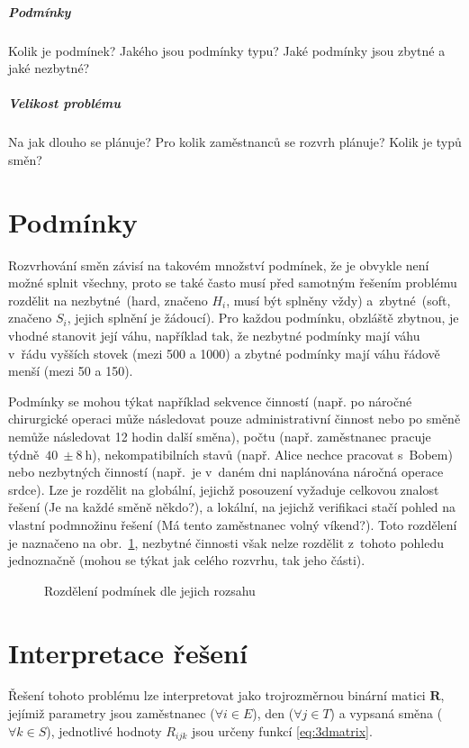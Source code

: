 \documentclass[twoside]{ctuthesis}
\begin{document}
\begin{enumerate}[label=\textbf{O\arabic*.}]
\subparagraph{Podmínky}
Kolik je podmínek? Jakého jsou podmínky typu? Jaké podmínky jsou zbytné a jaké nezbytné?

\subparagraph{Velikost problému}
Na jak dlouho se plánuje? Pro kolik zaměstnanců se rozvrh plánuje? Kolik je typů směn?


\section{Podmínky}
\label{sec:constraints}
Rozvrhování směn závisí na takovém množství podmínek, že je obvykle není možné splnit všechny, proto se také často musí před samotným řešením problému rozdělit na nezbytné~(hard, značeno $H_i$, musí být splněny vždy) a~zbytné~(soft, značeno $S_i$, jejich splnění je žádoucí). \cite{todorovic2012bee} Pro každou podmínku, obzláště zbytnou, je vhodné stanovit její váhu, například tak, že nezbytné podmínky mají váhu v~řádu vyšších stovek (mezi 500 a 1000) a zbytné podmínky mají váhu řádově menší (mezi 50 a 150). \cite{buyukozkan2014applicability}

Podmínky se mohou týkat například sekvence činností (např. po náročné chirurgické operaci může následovat pouze administrativní činnost nebo po směně nemůže následovat 12 hodin další směna), počtu (např. zaměstnanec pracuje týdně~$ 40~\pm 8~\mbox{h}$), nekompatibilních stavů (např. Alice nechce pracovat s~Bobem) nebo nezbytných činností (např.~je v~daném dni naplánována náročná operace srdce). Lze je rozdělit na globální, jejichž posouzení vyžaduje celkovou znalost řešení (Je na každé směně někdo?), a lokální, na jejichž verifikaci stačí pohled na vlastní podmnožinu řešení (Má tento zaměstnanec volný víkend?). Toto rozdělení je naznačeno na obr.~\ref{fig:constraints}, nezbytné činnosti však nelze rozdělit z~tohoto pohledu jednoznačně (mohou se týkat jak celého rozvrhu, tak jeho části). \cite{blochliger2004modeling}

\begin{figure}[h]
	
	\caption{Rozdělení podmínek dle jejich rozsahu}
	\label{fig:constraints}
\end{figure}


\section{Interpretace řešení}
Řešení tohoto problému lze interpretovat jako trojrozměrnou binární matici $\boldsymbol{R}$, jejímiž parametry jsou zaměstnanec ($\forall i \in E$), den ($\forall j \in T$) a vypsaná směna ($\forall k \in S$), jednotlivé hodnoty $R_{ijk}$ jsou určeny funkcí \ref{eq:3dmatrix}. \cite{vaclavik2016roster}


\end{enumerate}
\end{document}
